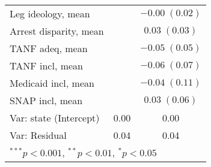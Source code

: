 \begin{table}
\begin{center}
\begin{tabular}{l c c }
Leg ideology, mean         &                        & $-0.00 \; (0.02)$      \\
Arrest disparity, mean     &                        & $0.03 \; (0.03)$       \\
TANF adeq, mean            &                        & $-0.05 \; (0.05)$      \\
TANF incl, mean            &                        & $-0.06 \; (0.07)$      \\
Medicaid incl, mean        &                        & $-0.04 \; (0.11)$      \\
SNAP incl, mean            &                        & $0.03 \; (0.06)$       \\
\hline
Var: state (Intercept)     & 0.00                   & 0.00                   \\
Var: Residual              & 0.04                   & 0.04                   \\
\hline
\multicolumn{3}{l}{\scriptsize{$^{***}p<0.001$, $^{**}p<0.01$, $^*p<0.05$}}
\end{tabular}
\label{table:coefficients}
\end{center}
\end{table}
